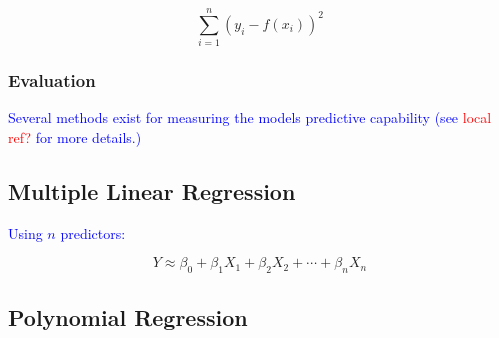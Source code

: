 \begin{equation}
{\sum_{i=1}^{n}{(y_i - f(x_i))^2}}
\label{eq:rss_def}
\end{equation}


\subsubsection{Evaluation}

\textcolor{blue}{Several methods exist for measuring the models predictive capability (see \textcolor{red}{local ref?} for more details.)}

\subsection{Multiple Linear Regression}

\textcolor{blue}{Using $n$ predictors:}

\begin{equation}
{Y \approx \beta_0 + \beta_1 X_1 + \beta_2 X_2 + \cdots + \beta_n X_n}
\label{eq:mlr_ex}
\end{equation}


\subsection{Polynomial Regression}
